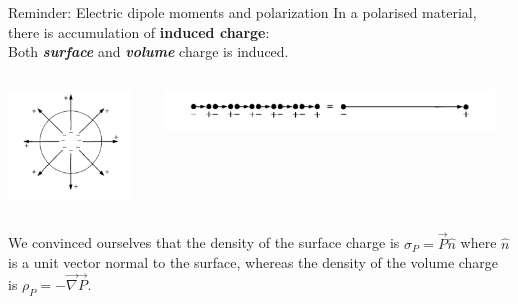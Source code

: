 {\begin{frame}{Reminder: Electric dipole moments and polarization}
In a polarised material, there is accumulation of {\bf induced charge}:\\
Both {\em \bf surface} and {\em \bf volume} charge is induced.\\
\begin{columns}
  \begin{column}{0.20\textwidth}
    \begin{center}
      \includegraphics[width=0.92\textwidth]{./images/schematics/divergent_polarization.png}\\
    \end{center}
  \end{column}
  \begin{column}{0.80\textwidth}
    \begin{center}
       \includegraphics[width=0.95\textwidth]{./images/schematics/polarization_charges.png}\\
     \end{center}
  \end{column}
\end{columns}

We convinced ourselves that the density of the surface charge is $\displaystyle \sigma_{P} = \vec{P} \hat{n}$
where $\hat{n}$ is a unit vector normal to the surface,
whereas the density of the volume charge is $\displaystyle \rho_{P} = - \vec{\nabla} \vec{P}$.


\end{frame}}
